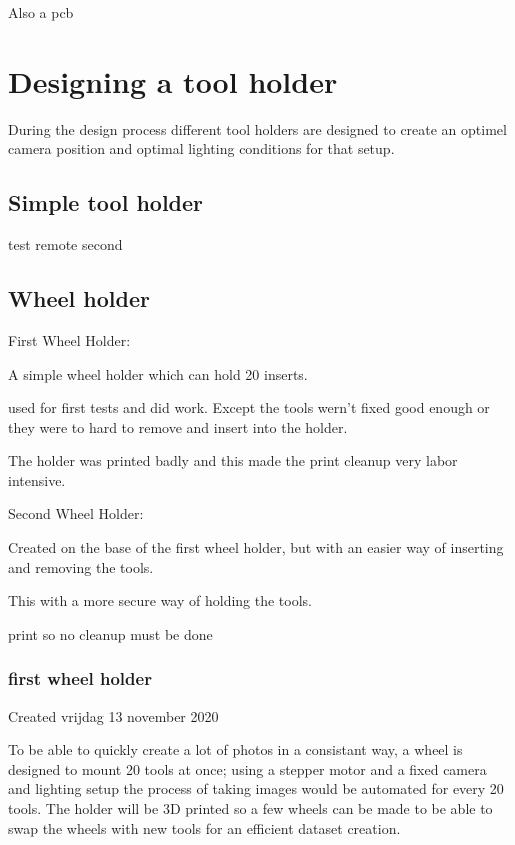 Also a pcb 

\section{Designing a tool holder}
During the design process different tool holders are designed to create an optimel camera position and optimal lighting conditions for that setup.
\subsection{Simple tool holder}
test remote second
\subsection{Wheel holder}
First Wheel Holder:

A simple wheel holder which can hold 20 inserts.

used for first tests and did work. Except the tools wern't fixed good enough or they were to hard to remove and insert into the holder.

The holder was printed badly and this made the print cleanup very labor intensive. 

Second Wheel Holder:

Created on the base of the first wheel holder, but with an easier way of inserting and removing the tools. 

This with a more secure way of holding the tools. 

print so no cleanup must be done

\subsubsection{first wheel holder}

Created vrijdag 13 november 2020



To be able to quickly create a lot of photos in a consistant way, a wheel is designed to mount 20 tools at once; using a stepper motor and a fixed camera and lighting setup the process of taking images would be automated for every 20 tools. The holder will be 3D printed so a few wheels can be made to be able to swap the wheels with new tools for an efficient dataset creation.



